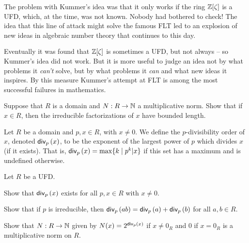 The problem with Kummer's idea was that it only works if the ring \(\mathbb{Z}[\zeta]\) is a UFD, which, at the time, was not known. Nobody had bothered to check! The idea that this line of attack might solve the famous FLT led to an explosion of new ideas in algebraic number theory that continues to this day.

Eventually it was found that \(\mathbb{Z}[\zeta]\) is sometimes a UFD, but not always -- so Kummer's idea did not work. But it is more useful to judge an idea not by what problems it \emph{can't} solve, but by what problems it \emph{can} and what new ideas it inspires. By this measure Kummer's attempt at FLT is among the most successful failures in mathematics.



\Exercises%

\begin{exercise}
Suppose that \(R\) is a domain and \(N : R \rightarrow \mathbb{N}\) a multiplicative norm. Show that if \(x \in R\), then the irreducible factorizations of \(x\) have bounded length.
\end{exercise}

\begin{dfn}
Let \(R\) be a domain and \(p,x \in R\), with \(x \neq 0\). We define the \(p\)-divisibility order of \(x\), denoted \(\mathsf{div}_{p}\left(x\right)\), to be the exponent of the largest power of \(p\) which divides \(x\) (if it exists). That is, \(\mathsf{div}_{p}\left(x\right) = \max \{ k \mid p^k | x \}\) if this set has a maximum and is undefined otherwise.
\end{dfn}

\begin{exercise}
Let \(R\) be a UFD.
\begin{proplist}
\item Show that \(\mathsf{div}_{p}\left(x\right)\) exists for all \(p,x \in R\) with \(x \neq 0\).
\item Show that if \(p\) is irreducible, then \(\mathsf{div}_{p}\left(ab\right) = \mathsf{div}_{p}\left(a\right) + \mathsf{div}_{p}\left(b\right)\) for all \(a,b \in R\).
\item Show that \(N : R \rightarrow \mathbb{N}\) given by \(N(x) = 2^{\mathsf{div}_{p}\left(x\right)}\) if \(x \neq 0_R\) and \(0\) if \(x = 0_R\) is a multiplicative norm on \(R\).
\end{proplist}
\end{exercise}
